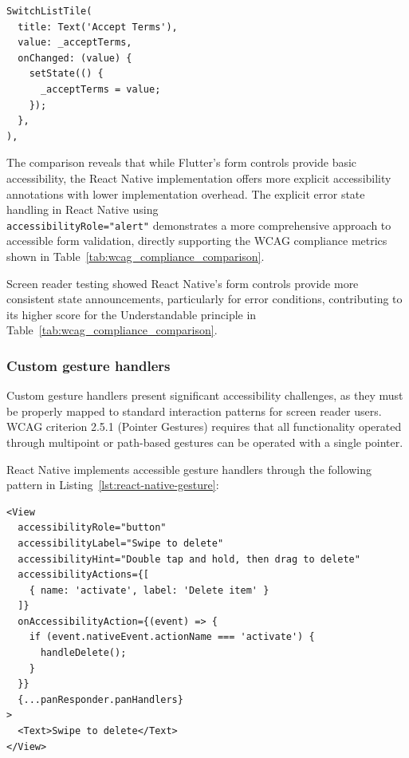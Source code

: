 \begin{lstlisting}[style=DartStyle, caption=Selection controls in Budai's Flutter code, label=lst:budai-selection-controls]
SwitchListTile(
  title: Text('Accept Terms'),
  value: _acceptTerms,
  onChanged: (value) {
    setState(() {
      _acceptTerms = value;
    });
  },
),
\end{lstlisting}

\pagebreak

The comparison reveals that while Flutter's form controls provide basic accessibility, the React Native implementation offers more explicit accessibility annotations with lower implementation overhead. The explicit error state handling in React Native using \\ \texttt{accessibilityRole="alert"} demonstrates a more comprehensive approach to accessible form validation, directly supporting the WCAG compliance metrics shown in Table~\ref{tab:wcag_compliance_comparison}.

Screen reader testing showed React Native's form controls provide more consistent state announcements, particularly for error conditions, contributing to its higher score for the Understandable principle in Table~\ref{tab:wcag_compliance_comparison}.

\subsubsection{Custom gesture handlers}
\label{subsubsec:gesture-handlers}

Custom gesture handlers present significant accessibility challenges, as they must be properly mapped to standard interaction patterns for screen reader users. WCAG criterion 2.5.1 (Pointer Gestures) requires that all functionality operated through multipoint or path-based gestures can be operated with a single pointer.

React Native implements accessible gesture handlers through the following pattern in Listing~\ref{lst:react-native-gesture}:

\begin{lstlisting}[style=ReactNativeStyle, caption=Accessible gesture handler in React Native, label=lst:react-native-gesture]
<View
  accessibilityRole="button"
  accessibilityLabel="Swipe to delete"
  accessibilityHint="Double tap and hold, then drag to delete"
  accessibilityActions={[
    { name: 'activate', label: 'Delete item' }
  ]}
  onAccessibilityAction={(event) => {
    if (event.nativeEvent.actionName === 'activate') {
      handleDelete();
    }
  }}
  {...panResponder.panHandlers}
>
  <Text>Swipe to delete</Text>
</View>
\end{lstlisting}

